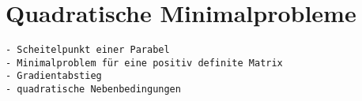 %
%
%
\section{Quadratische Minimalprobleme
\label{buch:fuvar:section:quadratisch}}

\begin{verbatim}
- Scheitelpunkt einer Parabel
- Minimalproblem für eine positiv definite Matrix
- Gradientabstieg
- quadratische Nebenbedingungen
\end{verbatim}
